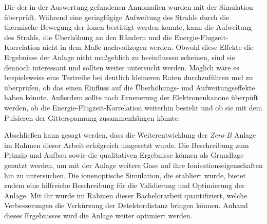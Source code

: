 Die der in der Auswertung gefundenen Annomalien wurden mit der Simulation überprüft. Während eine geringfügige Aufweitung des Strahls durch die thermische Bewegung der Ionen bestätigt werden konnte, kann die Aufweitung des Strahls, die Überhöhung an den Rändern und die Energie-Flugzeit-Korrelation nicht in dem Maße nachvollzogen werden. Obwohl diese Effekte die Ergebnisse der Anlage nicht maßgeblich zu beeinflussen scheinen, sind sie dennoch interessant und sollten weiter untersucht werden. Möglich wäre es bespielsweise eine Testreihe bei deutlich kleineren Raten durchzuführen und zu überprüfen, ob das einen Einfluss auf die Überhöhungs- und Aufweitungseffekte haben könnte. Außerdem sollte nach Erneuerung der Elektronenkanone überpüft werden, ob die Energie-Flugzeit-Korrelation weiterhin besteht und ob sie mit dem Pulsieren der Gitterspannung zusammenhängen könnte.

Abschließen kann gesagt werden, dass die Weiterentwicklung der \textit{Zero-B} Anlage im Rahmen dieser Arbeit erfolgreich umgesetzt wurde. Die Beschreibung zum Prinzip und Aufbau sowie die qualitativen Ergebnisse können als Grundlage genutzt werden, um mit der Anlage weitere Gase auf ihre Ionisationseigenschaften hin zu untersuchen. Die ionenoptische Simulation, die etabliert wurde, bietet zudem eine hilfreiche Beschreibung für die Validierung und Optimierung der Anlage. Mit ihr wurde im Rahmen dieser Bachelorarbeit quantifiziert, welche Verbesserungen die Verkürzung der Detektordistanz bringen können. Anhand dieses Ergebnisses wird die Anlage weiter optimiert werden. 
